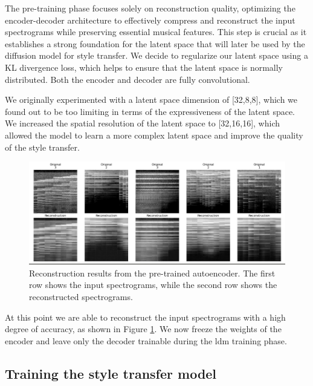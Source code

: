 The pre-training phase focuses solely on reconstruction quality, optimizing the encoder-decoder architecture to effectively compress and reconstruct the input spectrograms while preserving essential musical features. This step is crucial as it establishes a strong foundation for the latent space that will later be used by the diffusion model for style transfer. We decide to regularize our latent space using a KL divergence loss, which helps to ensure that the latent space is normally distributed. Both the encoder and decoder are fully convolutional.

We originally experimented with a latent space dimension of [32,8,8], which we found out to be too limiting in terms of the expressiveness of the latent space. We increased the spatial resolution of the latent space to [32,16,16], which allowed the model to learn a more complex latent space and improve the quality of the style transfer.

\begin{figure}[h]
    \centering
    \includegraphics[width=\textwidth]{figures/reconstruction.jpeg}
    \caption{Reconstruction results from the pre-trained autoencoder. The first row shows the input spectrograms, while the second row shows the reconstructed spectrograms. }
    \label{fig:reconstruction}
\end{figure}

\noindent At this point we are able to reconstruct the input spectrograms with a high degree of accuracy, as shown in Figure \ref{fig:reconstruction}. We now freeze the weights of the encoder and leave only the decoder trainable during the ldm training phase.

\subsection{Training the style transfer model}


